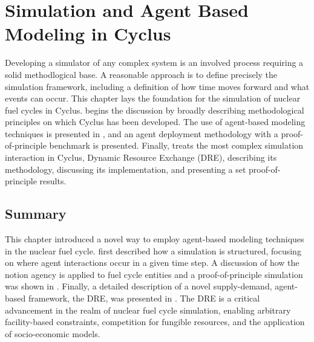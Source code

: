 \chapter{Simulation and Agent Based Modeling in Cyclus}\label{ch:abm}

Developing a simulator of any complex system is an involved process requiring a
solid methodlogical base. A reasonable approach is to define precisely the
simulation framework, including a definition of how time moves forward and what
events can occur. This chapter lays the foundation for the simulation of nuclear
fuel cycles in Cyclus.  begins the discussion by broadly
describing methodological principles on which Cyclus has been developed. The use
of agent-based modeling techniques is presented in , and an
agent deployment methodology with a proof-of-principle benchmark is
presented. Finally,  treats the most complex simulation
interaction in Cyclus, Dynamic Resource Exchange (DRE), describing its
methodology, discussing its implementation, and presenting a set
proof-of-principle results.







\section{Summary}

This chapter introduced a novel way to employ agent-based modeling techniques in
the nuclear fuel cycle.  first described how a simulation is
structured, focusing on where agent interactions occur in a given time step. A
discussion of how the notion agency is applied to fuel cycle entities and a
proof-of-principle simulation was shown in . Finally, a detailed
description of a novel supply-demand, agent-based framework, the DRE, was
presented in . The DRE is a critical advancement in the realm of
nuclear fuel cycle simulation, enabling arbitrary facility-based constraints,
competition for fungible resources, and the application of socio-economic models.
